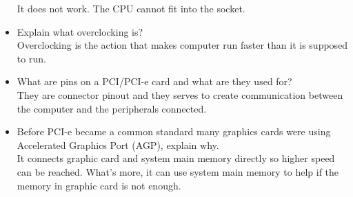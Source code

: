 \documentclass{article}
\begin{document}
\begin{itemize}
It does not work. The CPU cannot fit into the socket.
\item Explain what overclocking is?\\
Overclocking is the action that makes computer run faster than it is supposed to run.
\item What are pins on a PCI/PCI-e card and what are they used for?\\
They are connector pinout and they serves to create communication between the computer and the peripherals connected.
\item Before PCI-e became a common standard many graphics cards were using Accelerated Graphics Port (AGP), explain why. \\
It connects graphic card and system main memory directly so higher speed can be reached. What's more, it can use system main memory to help if the memory in graphic card is not enough.
\end{itemize}
\end{document}
